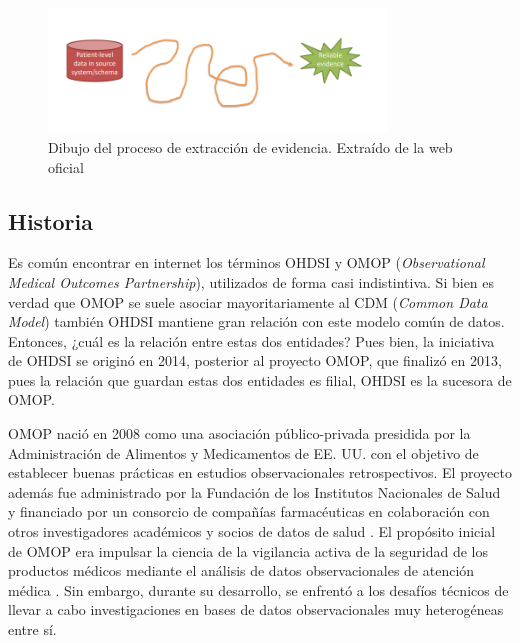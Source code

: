 \begin{enumerate}[label=\roman*.]
\begin{figure}[H]
    \centering
    \includegraphics[width=0.80\textwidth]{figures/drawinJourney.png}
     \caption{Dibujo del proceso de extracción de evidencia. Extraído de la web oficial \cite{OHDSIwebsite}}
    \label{fig:drawinJourney}
\end{figure}



\end{enumerate}

\subsection{Historia}

Es común encontrar en internet los términos OHDSI y OMOP (\textit{Observational Medical Outcomes Partnership}), utilizados de forma casi indistintiva. Si bien es verdad que OMOP se suele asociar mayoritariamente al CDM (\textit{Common Data Model}) también OHDSI mantiene gran relación con este modelo común de datos. Entonces, ¿cuál es la relación entre estas dos entidades? Pues bien, la iniciativa de OHDSI se originó en 2014, posterior al proyecto OMOP, que finalizó en 2013, pues la relación que guardan estas dos entidades es filial, OHDSI es la sucesora de OMOP. 

OMOP nació en 2008 como una asociación público-privada presidida por la Administración de Alimentos y Medicamentos de EE. UU. con el objetivo de establecer buenas prácticas en estudios observacionales retrospectivos. El proyecto además fue administrado por la Fundación de los Institutos Nacionales de Salud y financiado por un consorcio de compañías farmacéuticas en colaboración con otros investigadores académicos y socios de datos de salud \cite{stang2010advancing}. El propósito inicial de OMOP era impulsar la ciencia de la vigilancia activa de la seguridad de los productos médicos mediante el análisis de datos observacionales de atención médica \cite{stang2010advancing}. Sin embargo, durante su desarrollo, se enfrentó a los desafíos técnicos de llevar a cabo investigaciones en bases de datos observacionales muy heterogéneas entre sí.

